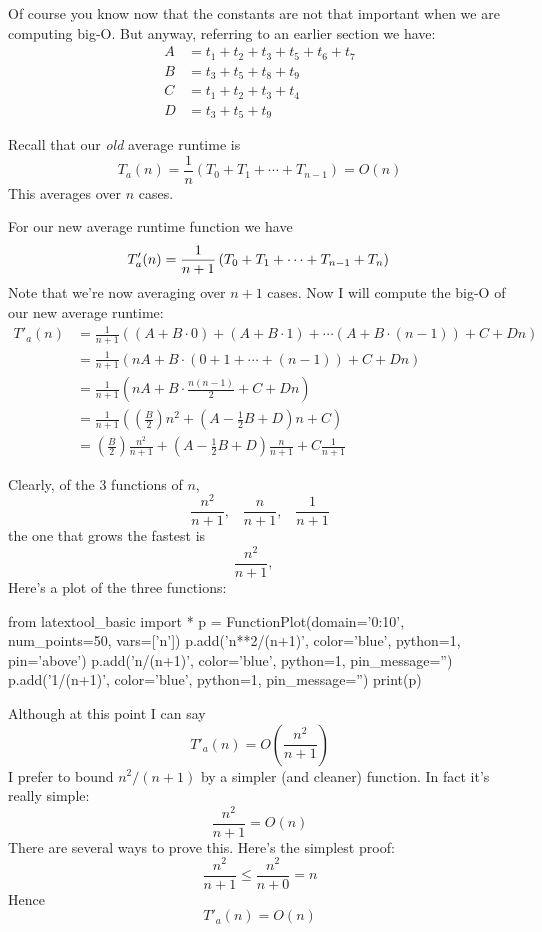 Of course you know now that the constants are not that important
when we are computing big-O.
But anyway, referring to an earlier section we have:
\begin{align*}
A &= t_1 + t_2 + t_3 + t_5 + t_6 + t_7 \\
B &= t_3 + t_5 + t_8 + t_9 \\
C &= t_1 + t_2 + t_3 + t_4 \\
D &= t_3 + t_5 + t_9
\end{align*}

Recall that our \textit{old} average runtime is
\[
T_a(n) 
= \frac{1}{n} 
   \left(
     T_0 + T_1 + \cdots + T_{n - 1} 
   \right) 
= O(n)
\]
This averages over $n$ cases.

For our new average runtime function we have
\[
T'_a(n) 
= \frac{1}{n + 1} 
   \left(
     T_0 + T_1 + \cdots + T_{n - 1} + T_n 
   \right)\\
\]
Note that we're now averaging over $n + 1$ cases.
Now I will compute the big-O of our new average runtime:
\begin{align*}
T'_a(n) 
&= \frac{1}{n + 1}
   \left(
     (A + B\cdot 0) + 
     (A + B\cdot 1) + \cdots
     (A + B\cdot (n - 1)) + 
     C + Dn
   \right)\\
&= \frac{1}{n + 1}
   \left(
     nA + B\cdot (0 + 1 + \cdots + (n - 1)) +
     C + Dn
   \right)\\
&= \frac{1}{n + 1}
   \left(
     nA + B\cdot \frac{n(n-1)}{2} +
     C + Dn
   \right)\\
&= \frac{1}{n + 1}
   \left(
   \left( \frac{B}{2} \right) n^2
   + \left( A - \frac{1}{2}B + D \right) n
   + C
   \right)
\\
&= \left( \frac{B}{2} \right) \frac{n^2}{n + 1}
   + \left( A - \frac{1}{2}B + D \right) \frac{n}{n + 1}
   + C \frac{1}{n + 1}
\end{align*}

Clearly, of the 3 functions of $n$, 
\[
\frac{n^2}{n + 1}, \,\,\,\,\,
\frac{n}{n + 1}, \,\,\,\,\,
\frac{1}{n + 1}
\]
the one that grows the fastest is 
\[
\frac{n^2}{n + 1}, \,\,\,\,\,
\]
Here's a plot of the three functions:
\begin{python}
from latextool_basic import *
p = FunctionPlot(domain='0:10', num_points=50, vars=['n'])
p.add('n**2/(n+1)', color='blue', python=1, pin='above')
p.add('n/(n+1)', color='blue', python=1, pin_message='')
p.add('1/(n+1)', color='blue', python=1, pin_message='')
print(p)
\end{python}

Although at this point I can say 
\[
T'_a(n) = O\left( \frac{n^2}{n + 1}\right)
\]
I prefer to bound $n^2/(n + 1)$ by a simpler (and cleaner) function.
In fact it's really simple:
\[
\frac{n^2}{n + 1} = O(n)
\]
There are several ways to prove this.
Here's the simplest proof:
\[
\frac{n^2}{n + 1} 
\leq 
\frac{n^2}{n + 0} = n
\]
Hence 
\[
T'_a(n) = O(n)
\]

